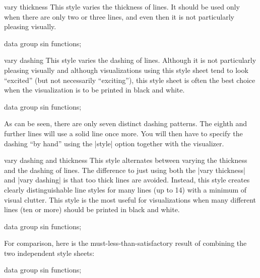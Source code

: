 \begin{stylesheet}{vary thickness}
  This style varies the thickness of lines. It should be used only
  when there are only two or three lines, and even then it is not
  particularly pleasing visually.
\begin{codeexample}[width=10cm]
\tikz \datavisualization [
  visualize as smooth line/.list=
    {1,2,3,4,5,6,7,8},
  example visualization,
  style sheet=vary thickness]
data group {sin functions};
\end{codeexample}
\end{stylesheet}


\begin{stylesheet}{vary dashing}
  This style varies the dashing of lines. Although it is not
  particularly pleasing visually and although visualizations using
  this style sheet tend to look ``excited'' (but not necessarily
  ``exciting''), this style sheet is often the best choice when the
  visualization is to be printed in black and white.
\begin{codeexample}[width=10cm]
\tikz \datavisualization [
  visualize as smooth line/.list=
    {1,2,3,4,5,6,7,8},
  example visualization,
  style sheet=vary dashing]
data group {sin functions};
\end{codeexample}
  As can be seen, there are only seven distinct dashing patterns. The
  eighth and further lines will use a solid line once more. You will
  then have to specify the dashing ``by hand'' using the |style|
  option together with the visualizer.
\end{stylesheet}

\begin{stylesheet}{vary dashing and thickness}
  This style alternates between varying the thickness and the dashing
  of lines. The 
  difference to just using both the |vary thickness| and
  |vary dashing| is that too thick lines are avoided. Instead, this
  style creates clearly distinguishable line styles for many lines (up
  to 14) with a minimum of visual clutter. This style is the most
  useful for visualizations when many different lines (ten or more)
  should be printed in black and white.
\begin{codeexample}[width=10cm]
\tikz \datavisualization [
  visualize as smooth line/.list=
    {1,2,3,4,5,6,7,8},
  example visualization,
  style sheet=vary thickness
              and dashing]
data group {sin functions};
\end{codeexample}
  For comparison, here is the must-less-than-satisfactory result of
  combining the two independent style sheets:
\begin{codeexample}[width=10cm]
\tikz \datavisualization [
  visualize as smooth line/.list=
    {1,2,3,4,5,6,7,8},
  example visualization,
  style sheet=vary thickness,
  style sheet=vary dashing]
data group {sin functions};
\end{codeexample}
\end{stylesheet}


